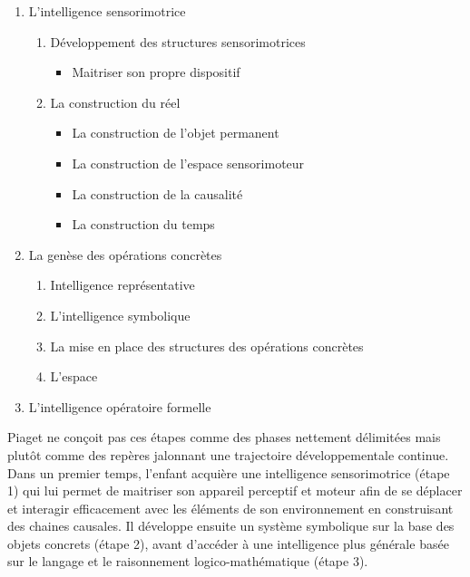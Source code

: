 \begin{enumerate}[itemsep=0pt, parsep=0pt, partopsep=0pt]
	\item L'intelligence sensorimotrice
	\begin{enumerate}[itemsep=0pt, topsep=0pt, parsep=0pt, partopsep=0pt]
		\item Développement des structures sensorimotrices
		\begin{itemize}[label=\scalebox{.85}{$\diamond$}, itemsep=0pt, topsep=0pt, parsep=0pt, partopsep=0pt]
			\item Maitriser son propre dispositif
		\end{itemize}
		\item La construction du réel
		\begin{itemize}[label=\scalebox{.85}{$\diamond$}, itemsep=0pt, topsep=0pt, parsep=0pt, partopsep=0pt]
			\item La construction de l'objet permanent
			\item La construction de l'espace sensorimoteur
			\item La construction de la causalité
			\item La construction du temps
		\end{itemize} 
	\end{enumerate} 
	\item La genèse des opérations concrètes
	\begin{enumerate}[itemsep=0pt, topsep=0pt, parsep=0pt, partopsep=0pt]
		\item Intelligence représentative
		\item L'intelligence symbolique
		\item La mise en place des structures des opérations concrètes
		\item L'espace
	\end{enumerate} 
	\item L'intelligence opératoire formelle 
\end{enumerate}

Piaget ne conçoit pas ces étapes comme des phases nettement délimitées mais plutôt comme des repères jalonnant une trajectoire développementale continue. 
Dans un premier temps, l'enfant acquière une intelligence sensorimotrice (étape 1) qui lui permet de maitriser son appareil perceptif et moteur afin de se déplacer et interagir efficacement avec les éléments de son environnement en construisant des chaines causales. 
Il développe ensuite un système symbolique sur la base des objets concrets (étape 2), avant d'accéder à une intelligence plus générale basée sur le langage et le raisonnement logico-mathématique (étape 3). 


